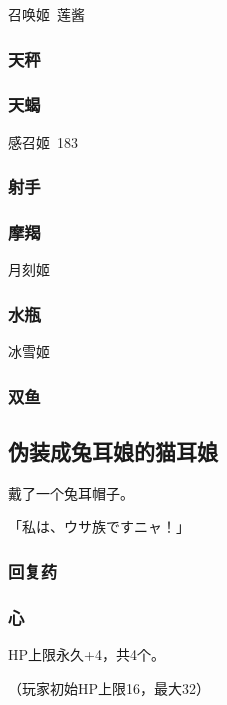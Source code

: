 \documentclass{article}
\begin{document}
召唤姬\ 莲酱

\subsubsection{天秤}
\label{costume_bunny}



\subsubsection{天蝎}
\label{costume_bathtowel}

感召姬\ 183


\subsubsection{射手}
\label{costume_gundam}



\subsubsection{摩羯}

月刻姬

\subsubsection{水瓶}

冰雪姬

\subsubsection{双鱼}

\subsection{伪装成兔耳娘的猫耳娘}

戴了一个兔耳帽子。

「私は、ウサ族ですニャ！」

\subsubsection{回复药}

\subsubsection{心}

HP上限永久+4，共4个。

（玩家初始HP上限16，最大32）
\end{document}
